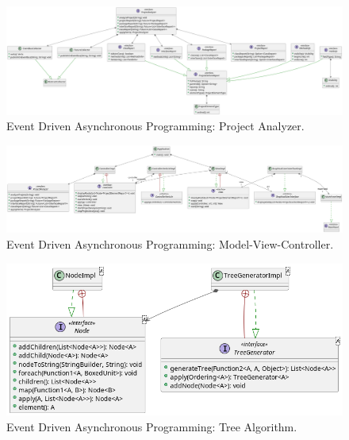 \documentclass[12pt,a4paper,openright,twoside]{book}
\begin{document}
\begin{figure}
	\centering
	\includegraphics[angle=90, height=\textheight]{figures/EDAPProjectAnalyzer-0.png}
	\caption{Event Driven Asynchronous Programming: Project Analyzer.}
	\label{fig:edappa}
\end{figure}
\begin{figure}
	\centering
	\includegraphics[angle=90, height=\textheight]{figures/EDAPMVC-0.png}
	\caption{Event Driven Asynchronous Programming: Model-View-Controller.}
	\label{fig:edapmvc}
\end{figure}
\begin{figure}
	\centering
	\includegraphics[width=\textwidth]{figures/TreeAlgorithm-0.png}
	\caption{Event Driven Asynchronous Programming: Tree Algorithm.}
	\label{fig:edapta}
\end{figure}
\end{document}
